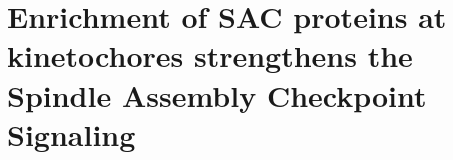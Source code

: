\chapter{Enrichment of SAC proteins at kinetochores strengthens the Spindle Assembly Checkpoint Signaling}
\label{chpt:2}